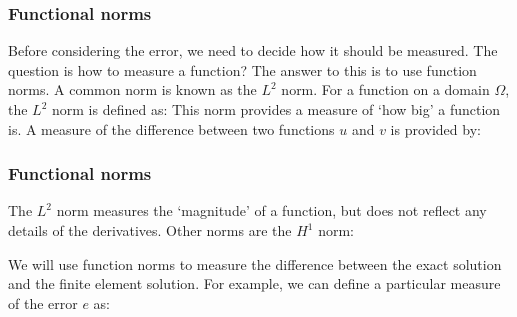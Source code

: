 \documentclass[notes]{beamer}
\begin{document}
\begin{frame}
\frametitle{Functional norms}
Before considering the error, we need to decide how it should be measured. The question
is how to measure a function? The answer to this is to use function norms. A common
norm is known as the $L^2$ norm. For a function on a domain $\Omega$, the $L^2$ norm is defined
as:
This norm provides a measure of ‘how big’ a function is. A measure of the difference
between two functions $u$ and $v$ is provided by:
\end{frame}

\begin{frame}
\frametitle{Functional norms}
The $L^2$ norm measures the `magnitude' of a function, but does not reflect any details of
the derivatives. Other norms are the $H^1$ norm:

We will use function norms to measure the difference between the exact solution and
the finite element solution. For example, we can define a particular measure of the error
$e$ as:
\end{frame}
\end{document}

